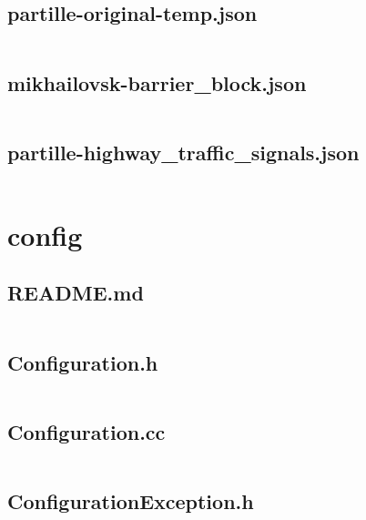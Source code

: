 \documentclass[../main.tex]{subfiles}
\begin{document}
\subsection{partille-original-temp.json}\label{lst:catchtest-testsettings-partille-original-temp-json}
\inputminted[linenos=true]{json}{parts/code/catchtest/testsettings/partille-original-temp.json}

\subsection{mikhailovsk-barrier\_block.json}\label{lst:catchtest-testsettings-restrictions-mikhailovsk-barrier-block-json}
\inputminted[linenos=true]{json}{parts/code/catchtest/testsettings/restrictions/mikhailovsk-barrier_block.json}

\subsection{partille-highway\_traffic\_signals.json}\label{lst:catchtest-testsettings-restrictions-partille-traffic-signals-json}
\inputminted[linenos=true]{json}{parts/code/catchtest/testsettings/restrictions/partille-hhighway_traffic_signals.json}

\section{config}

\subsection{README.md}\label{lst:config-readme-md}
\inputminted[breaklines=true]{text}{parts/code/config/README.md}

\subsection{Configuration.h}\label{lst:config-configuration-h}
\inputminted[linenos=true]{cpp}{parts/code/config/Configuration.h}

\subsection{Configuration.cc}\label{lst:config-configuration-cc}
\inputminted[linenos=true]{cpp}{parts/code/config/Configuration.cc}

\subsection{ConfigurationException.h}\label{lst:config-configuration-exception-h}
\inputminted[linenos=true]{cpp}{parts/code/config/ConfigurationException.h}
\end{document}
